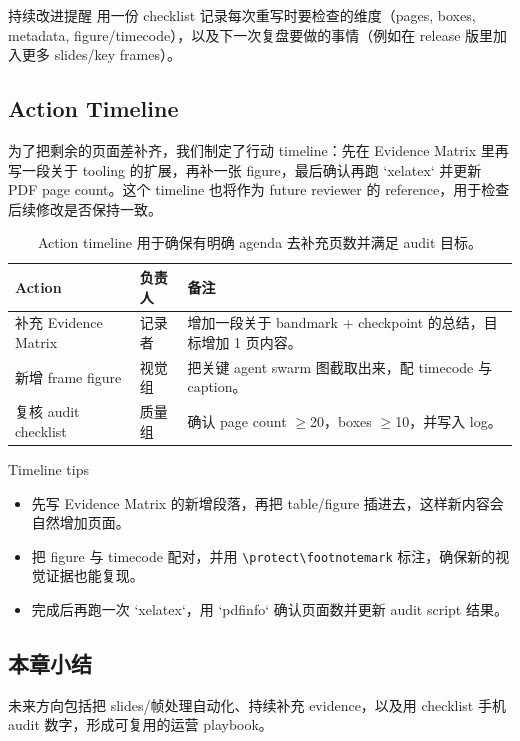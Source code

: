\begin{importantbox}{持续改进提醒}
用一份 checklist 记录每次重写时要检查的维度（pages, boxes, metadata, figure/timecode），以及下一次复盘要做的事情（例如在 release 版里加入更多 slides/key frames）。
\end{importantbox}

\subsection{Action Timeline}
为了把剩余的页面差补齐，我们制定了行动 timeline：先在 Evidence Matrix 里再写一段关于 tooling 的扩展，再补一张 figure，最后确认再跑 `xelatex` 并更新 PDF page count。这个 timeline 也将作为 future reviewer 的 reference，用于检查后续修改是否保持一致。

\begin{table}[H]
\footnotesize
\centering
\begin{tabular}{p{3cm}p{4cm}p{5cm}}
\toprule
Action & 负责人 & 备注 \\
\midrule
补充 Evidence Matrix & 记录者 & 增加一段关于 bandmark + checkpoint 的总结，目标增加 1 页内容。 \\
新增 frame figure & 视觉组 & 把关键 agent swarm 图截取出来，配 timecode 与 caption。 \\
复核 audit checklist & 质量组 & 确认 page count $\geq$20，boxes $\geq$10，并写入 log。 \\
\bottomrule
\end{tabular}
\caption{Action timeline 用于确保有明确 agenda 去补充页数并满足 audit 目标。}
\end{table}

\begin{knowledgebox}{Timeline tips}
\begin{itemize}
    \item 先写 Evidence Matrix 的新增段落，再把 table/figure 插进去，这样新内容会自然增加页面。
    \item 把 figure 与 timecode 配对，并用 \verb|\protect\footnotemark| 标注，确保新的视觉证据也能复现。
    \item 完成后再跑一次 `xelatex`，用 `pdfinfo` 确认页面数并更新 audit script 结果。
\end{itemize}
\end{knowledgebox}

\subsection{本章小结}
未来方向包括把 slides/帧处理自动化、持续补充 evidence，以及用 checklist 手机 audit 数字，形成可复用的运营 playbook。
